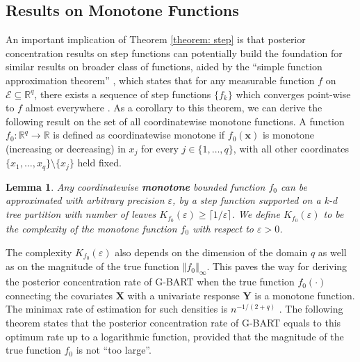 \documentclass[12pt]{article}
\newcommand{\bm}[1]{\boldsymbol{#1}}
\newcommand{\Y}{\bm{Y}}
\newcommand{\norm}[1]{\left\Vert#1\right\Vert}
\newcommand{\1}{\mathbb{I}}
\def\Y{\bm{Y}}
\def\X{\bm{X}}
\def\X{\mbox{\boldmath$X$}}
\renewcommand{\Y}{\bm{Y}}
\def\X{\bm{X}}
\theoremstyle{plain}
\newtheorem{lemma}[theorem]{Lemma}
\theoremstyle{definition}
\theoremstyle{remark}
\begin{document}
\subsection{Results on Monotone Functions}\label{sub: monotone_result}
An important implication of Theorem \ref{theorem: step} is that posterior concentration results on step functions can potentially build the foundation for similar results on broader class of functions, aided by the ``simple function approximation theorem'' \citep{stein2009real}, which states that for any measurable function $f$ on $\mathcal{E} \subseteq \mathbb{R}^q$, there exists a sequence of step functions $\{f_k\}$ which converges point-wise to $f$ almost everywhere \citep{stein2009real}. As a corollary to this theorem, we can derive the following result on the set of all coordinatewise monotone functions. A function $f_0: \mathbb{R}^q \rightarrow \mathbb{R}$ is defined as coordinatewise monotone if $f_0(\textbf{x})$ is monotone (increasing or decreasing) in $x_j$ for every $j \in \{1, \dots, q\}$, with all other coordinates $\{x_1, \dots, x_q\} \setminus \{x_j\}$ held fixed.

\begin{lemma}\label{lemma:monotone_approx}
Any coordinatewise {\bf monotone} bounded function $f_0$ can be approximated with arbitrary precision $\varepsilon$, by a step function supported on a k-d tree partition with number of leaves $K_{f_0}(\varepsilon) \ge \lceil 1/\varepsilon \rceil$. We define $K_{f_0}(\varepsilon)$ to be the {\it complexity of the monotone function $f_0$} with respect to $\varepsilon > 0$.
\end{lemma}
The complexity $K_{f_0}(\varepsilon)$ also depends on the dimension of the domain $q$ as well as on the magnitude of the true function $\norm{f_0}_\infty$. This paves the way for deriving the posterior concentration rate of G-BART when the true function $f_0(\cdot)$ connecting the covariates $\X$ with a univariate response $\Y$ is a monotone function. The minimax rate of estimation for such densities is $n^{-1/(2+q)}$ \citep{biau2003risk}. The following theorem states that the posterior concentration rate of G-BART equals to this optimum rate up to a logarithmic function, provided that the magnitude of the true function $f_0$ is not ``too large''.
\end{document}
